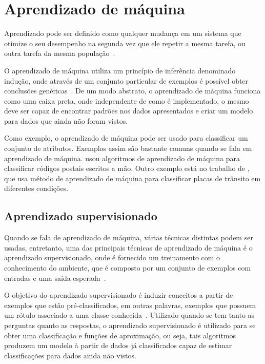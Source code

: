 \chapter{Aprendizado de máquina}

Aprendizado pode ser definido como qualquer mudança em um sistema que
otimize o seu desempenho na segunda vez que ele repetir a mesma tarefa,
ou outra tarefa da mesma população~\cite{custodio2010aprendizadomaquina}.

O aprendizado de máquina utiliza um princípio de inferência denominado
indução, onde através de um conjunto particular de exemplos é possível
obter conclusões genéricas~\cite{bruno2010aprendizadomaquina}. De um modo
abstrato, o aprendizado de máquina funciona como uma caixa preta, onde
independente de como é implementado, o mesmo deve ser capaz de encontrar padrões
nos dados apresentados e criar um modelo para dados que ainda não foram vistos.

Como exemplo, o aprendizado de máquina pode ser usado para classificar
um conjunto de atributos. Exemplos assim são bastante comuns quando se fala em
aprendizado de máquina.  usou algoritmos de
aprendizado de máquina para classificar códigos postais escritos a mão. Outro
exemplo está no trabalho de , que usa método de
aprendizado de máquina para classificar placas de trânsito em diferentes
condições.


\section{Aprendizado supervisionado}

Quando se fala de aprendizado de máquina, várias técnicas distintas podem ser
usadas, entretanto, uma das principais técnicas de aprendizado de máquina é o aprendizado
supervisionado, onde é fornecido um treinamento com o conhecimento do
ambiente, que é composto por um conjunto de exemplos com entradas
e uma saída esperada~\cite{bruno2010aprendizadomaquina}.

O objetivo do aprendizado supervisionado é induzir conceitos a partir de
exemplos que estão pré-classificados, em outras palavras, exemplos que
possuem um rótulo associado a uma classe conhecida~\cite{bruno2010aprendizadomaquina}.
Utilizado quando se tem tanto as perguntas quanto as respostas, o aprendizado
supervisionado é utilizado para se obter uma classificação e funções de aproximação, ou seja,
tais algoritmos produzem um modelo à partir de dados já classificados capaz de estimar classificações
para dados ainda não vistos.

